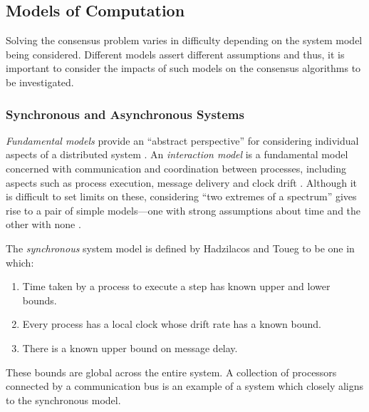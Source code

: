\documentclass[12pt, a4paper]{article}
\begin{document}

\subsection{Models of Computation} \label{sec:fundamental-models}

Solving the consensus problem varies in difficulty depending on the system model
being considered. Different models assert different assumptions and thus, it is
important to consider the impacts of such models on the consensus algorithms to
be investigated.

\subsubsection{Synchronous and Asynchronous Systems}

\textit{Fundamental models} provide an ``abstract perspective'' for considering
individual aspects of a distributed system \cite{coulouris2005distributed}. An
\textit{interaction model} is a fundamental model concerned with communication
and coordination between processes, including aspects such as process execution,
message delivery and clock drift \cite{coulouris2005distributed}. Although it is
difficult to set limits on these, considering ``two extremes of a spectrum''
gives rise to a pair of simple models---one with strong assumptions about time
and the other with none \cite{coulouris2005distributed, hadzilacos1994modular}.

The \textit{synchronous} system model is defined by Hadzilacos and Toueg
\cite{hadzilacos1994modular} to be one in which:

\begin{enumerate}
  \item Time taken by a process to execute a step has known upper and lower
    bounds.
  \item Every process has a local clock whose drift rate has a known bound.
  \item There is a known upper bound on message delay.
\end{enumerate}

These bounds are global across the entire system. A collection of processors
connected by a communication bus is an example of a system which closely aligns
to the synchronous model.
\end{document}
